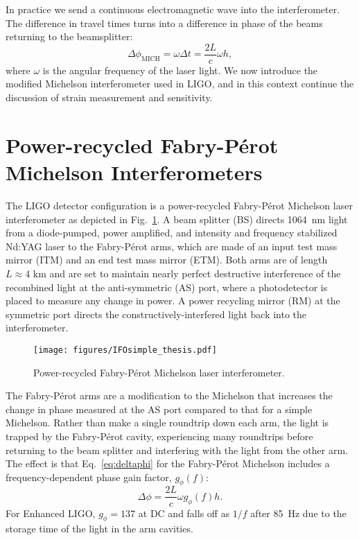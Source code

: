 In practice we send a
continuous electromagnetic wave into the interferometer. The
difference in travel times turns into a difference in phase of
the beams returning to the beamsplitter:
\begin{equation}
\Delta \phi_{\mathrm{MICH}} = \omega \Delta t = \frac{2 L}{c} \omega h,
\label{eq:deltaphi}
\end{equation}
where $\omega$ is the angular frequency of the laser light. We now
introduce the modified Michelson interferometer used in LIGO, and in
this context continue the discussion of strain measurement and
sensitivity.




\section{Power-recycled Fabry-P\'{e}rot Michelson Interferometers} 
The LIGO detector configuration is a power-recycled Fabry-P\'{e}rot
Michelson laser interferometer as depicted in
Fig.~\ref{fig:IFOschematic}. A beam splitter (BS) directs 1064~nm
light from a diode-pumped, power amplified, and intensity and
frequency stabilized Nd:YAG laser to the Fabry-P\'{e}rot arms, which
are made of an input test mass mirror (ITM) and an end test mass
mirror (ETM). Both arms are of length $L \approx 4 \text{ km}$ and are
set to maintain nearly perfect destructive interference of the
recombined light at the anti-symmetric (AS) port, where a
photodetector is placed to measure any change in power. A power
recycling mirror (RM) at the symmetric port directs the
constructively-interfered light back into the interferometer.

\begin{figure}
\begin{centering}
\texttt{[image: figures/IFOsimple\_thesis.pdf]}
\caption[Power-recycled Fabry-P\'{e}rot Michelson laser
interferometer]{Power-recycled Fabry-P\'{e}rot Michelson laser
  interferometer.}
\label{fig:IFOschematic}
\end{centering}
\end{figure}

The Fabry-P\'{e}rot arms are a modification to the Michelson that
increases the change in phase measured at the AS port compared to that
for a simple Michelson. Rather than make a single roundtrip down each
arm, the light is trapped by the Fabry-P\'{e}rot cavity, experiencing many
roundtrips before returning to the beam splitter and interfering with
the light from the other arm. The effect is that Eq.~\ref{eq:deltaphi}
for the Fabry-P\'{e}rot Michelson includes a frequency-dependent phase
gain factor, $g_{\phi}(f)$:
\begin{equation}
\Delta \phi = \frac{2 L}{c} \omega g_{\phi}(f) h.
\label{eq:deltaphi}
\end{equation}
For Enhanced LIGO, $g_{\phi} = 137$ at DC and falls off as $1/f$ after
85~Hz due to the storage time of the light in the arm cavities.

